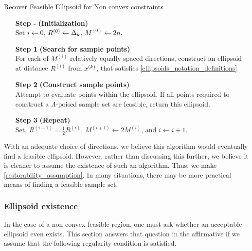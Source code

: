 {
\begin{fullwidth}[leftmargin=0in, rightmargin=0in, width=\linewidth-0.25in]
\begin{flushleft}


\begin{algorithm}[H]
    \caption{Recover Feasible Ellipsoid for Non convex constraints}	
    \label{general_recover}
    \begin{itemize}
        \item[\textbf{Step -}] \textbf{(Initialization)} \\
        		Set $i\gets0$, $R^{(0)} \gets \Delta_k$, $M^{(0)} \gets 2n$.
        		
        \item[\textbf{Step 1}] \textbf{(Search for sample points)} \\
        	For each of $M^{(i)}$ relatively equally spaced directions,
        	construct an ellipsoid at distance $R^{(i)}$ from $x^{(k)}$, that satisfies \cref{ellipsoids_notation_definitions}
        	
        \item[\textbf{Step 2}] \textbf{(Construct sample points)} \\
        	Attempt to evaluate points within the ellipsoid.
        	If all points required to construct a $\Lambda$-poised sample set are feasible, return this ellipsoid.
        \item[\textbf{Step 3}] \textbf{(Repeat)} \\
        	Set, $R^{(i+1)} = \frac 1 2 R^{(i)}$, $M^{(i+1)} \gets 2 M^{(i)}$, and $i \gets i + 1$.
    \end{itemize}
\end{algorithm}

\end{flushleft}
\end{fullwidth}
}

With an adequate choice of directions, we believe this algorithm would eventually find a feasible ellipsoid.
However, rather than discussing this further, we believe it is cleaner to assume the existence of such an algorithm.
Thus, we make \cref{restorability_assumption}.
In many situations, there may be more practical means of finding a feasible sample set.

\subsubsection{Ellipsoid existence}

In the case of a non-convex feasible region, one must ask whether an acceptable ellipsoid even exists.
This section answers that question in the affirmative if we assume that the following regularity condition is satisfied.

